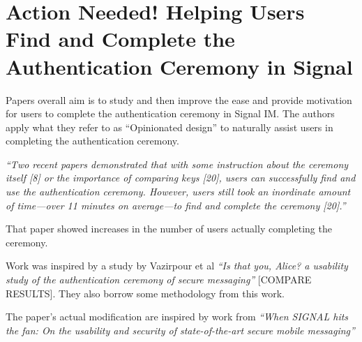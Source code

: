 \section{Action Needed! Helping Users Find and Complete the
Authentication Ceremony in Signal}

Papers overall aim is to study and then improve the ease and provide motivation for users to complete the authentication ceremony in Signal IM.
The authors apply what they refer to as ``Opinionated design'' to naturally assist users in completing the authentication ceremony.

\textit{``Two recent papers demonstrated that
with some instruction about the ceremony itself [8] or the
importance of comparing keys [20], users can successfully
find and use the authentication ceremony. However, users
still took an inordinate amount of time—over 11 minutes on
average—to find and complete the ceremony [20].''}

That paper showed increases in the number of users actually completing the ceremony.

Work was inspired by a study by Vazirpour et al \textit{``Is that you, Alice? a usability study of the authentication ceremony of secure messaging''} [COMPARE RESULTS]. They also borrow some methodology from this work.

The paper's actual modification are inspired by work from \textit{``When SIGNAL hits the fan: On the usability and security of state-of-the-art secure mobile messaging''}
